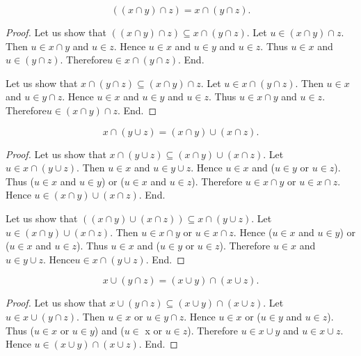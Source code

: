 \documentclass[../../sets-and-functions.ftl.tex]{subfiles}
\begin{document}
\begin{forthel}
    \begin{proposition}\label{SetTheory_01_01_368359}
      \[ ((x \cap y) \cap z) = x \cap (y \cap z). \]
    \end{proposition}
    \begin{proof}
      Let us show that $((x \cap y) \cap z) \subseteq x \cap (y \cap z)$.
        Let $u \in (x \cap y) \cap z$.
        Then $u \in x \cap y$ and $u \in z$.
        Hence $u \in x$ and $u \in y$ and $u \in z$.
        Thus $u \in x$ and $u \in (y \cap z)$.
        Therefore$ u \in x \cap (y \cap z)$.
      End.

      Let us show that $x \cap (y \cap z) \subseteq (x \cap y) \cap z$.
        Let $u \in x \cap (y \cap z)$.
        Then $u \in x$ and $u \in y \cap z$.
        Hence $u \in x$ and $u \in y$ and $u \in z$.
        Thus $u \in x \cap y$ and $u \in z$.
        Therefore$ u \in (x \cap y) \cap z$.
      End.
    \end{proof}

    \begin{proposition}\label{SetTheory_01_01_106755}
      \[ x \cap (y \cup z) = (x \cap y) \cup (x \cap z). \]
    \end{proposition}
    \begin{proof}
      Let us show that $x \cap (y \cup z) \subseteq (x \cap y) \cup (x \cap z)$.
        Let $u \in x \cap (y \cup z)$.
        Then $u \in x$ and $u \in y \cup z$.
        Hence $u \in x$ and ($u \in y$ or $u \in z$).
        Thus ($u \in x$ and $u \in y$) or ($u \in x$ and $u \in z$).
        Therefore $u \in x \cap y$ or $u \in x \cap z$.
        Hence $u \in (x \cap y) \cup (x \cap z)$.
      End.

      Let us show that $((x \cap y) \cup (x \cap z)) \subseteq x \cap (y \cup z)$.
        Let $u \in (x \cap y) \cup (x \cap z)$.
        Then $u \in x \cap y$ or $u \in x \cap z$.
        Hence ($u \in x$ and $u \in y$) or ($u \in x$ and $u \in z$).
        Thus $u \in x$ and ($u \in y$ or $u \in z$).
        Therefore $u \in x$ and $u \in y \cup z$.
        Hence$ u \in x \cap (y \cup z)$.
      End.
    \end{proof}

    \begin{proposition}\label{SetTheory_01_01_836290}
      \[ x \cup (y \cap z) = (x \cup y) \cap (x \cup z). \]
    \end{proposition}
    \begin{proof}
      Let us show that $x \cup (y \cap z) \subseteq (x \cup y) \cap (x \cup z)$.
        Let $u \in x \cup (y \cap z)$.
        Then $u \in x$ or $u \in y \cap z$.
        Hence $u \in x$ or ($u \in y$ and $u \in z$).
        Thus ($u \in x$ or $u \in y$) and ($u \in$ x or $u \in z$).
        Therefore $u \in x \cup y$ and $u \in x \cup z$.
        Hence $u \in (x \cup y) \cap (x \cup z)$.
      End.


\end{proof}
\end{forthel}
\end{document}
